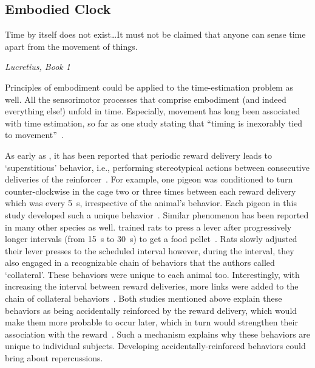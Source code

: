 \subsection{Embodied Clock}
\label{ch:intro:EmbodiedClock}
{\singlespacing \epigraph{Time by itself does not exist\ldots It must not be claimed that anyone can sense time apart from the movement of things.}
{\textit{Lucretius, Book 1}}}
\noindent
Principles of embodiment could be applied to the time-estimation problem as well.
All the sensorimotor processes that comprise embodiment (and indeed everything else!) unfold in time.
Especially, movement has long been associated with time estimation, so far as one study stating that ``timing is inexorably tied to movement''~\cite{Wiener2019eNeuro}.\footnotemark
{}
\par
As early as \citeyear{Skinner1948}, it has been reported that periodic reward delivery leads to `superstitious' behavior, i.e., performing stereotypical actions between consecutive deliveries of the reinforcer~\cite{Skinner1948}.
For example, one pigeon was conditioned to turn counter-clockwise in the cage two or three times between each reward delivery which was every 5~s, irrespective of the animal's behavior.
Each pigeon in this study developed such a unique behavior~\cite{Skinner1948}.
Similar phenomenon has been reported in many other species as well.
 trained rats to press a lever after progressively longer intervals (from 15~s to 30~s) to get a food pellet~\cite{Wilson1953}.
Rats slowly adjusted their lever presses to the scheduled interval however, during the interval, they also engaged in a recognizable chain of behaviors that the authors called `collateral'.
These behaviors were unique to each animal too.
Interestingly, with increasing the interval between reward deliveries, more links were added to the chain of collateral behaviors~\cite{Wilson1953}.
Both studies mentioned above explain these behaviors as being accidentally reinforced by the reward delivery, which would make them more probable to occur later, which in turn would strengthen their association with the reward~\cite{Killeen1988}.
Such a mechanism explains why these behaviors are unique to individual subjects.
Developing accidentally-reinforced behaviors could bring about repercussions.
